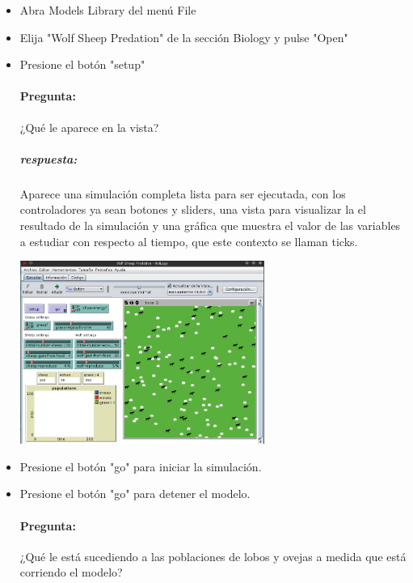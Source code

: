 \documentclass[12pt,letterpaper]{article}
\begin{document}
\vspace{10mm}
\begin{itemize}
	\renewcommand{\labelitemi}{\scriptsize$\blacksquare$} 
	
	
	
	\item Abra Models Library del menú File
	
	\item Elija "Wolf Sheep Predation" de la sección Biology y pulse "Open"
	
	\item Presione el botón "setup"
		\paragraph{Pregunta:}	
			¿Qué le aparece en la vista?
	
		\subparagraph{respuesta:}
			Aparece una simulación completa lista para ser ejecutada, con los controladores ya sean botones y sliders, una vista para visualizar la el resultado de la simulación y una gráfica que muestra el valor de las variables a estudiar con respecto al tiempo, que este contexto se llaman ticks.
			
			\begin{center}
				\includegraphics[width=8cm]{./imagenes/image1.png}
			\end{center}


	\item Presione el botón "go" para iniciar la simulación.
	\item Presione el botón "go" para detener el modelo.
		\paragraph{Pregunta:}
			¿Qué le está sucediendo a las poblaciones de lobos y ovejas a medida que está corriendo el modelo?
			

\end{itemize}
\end{document}
